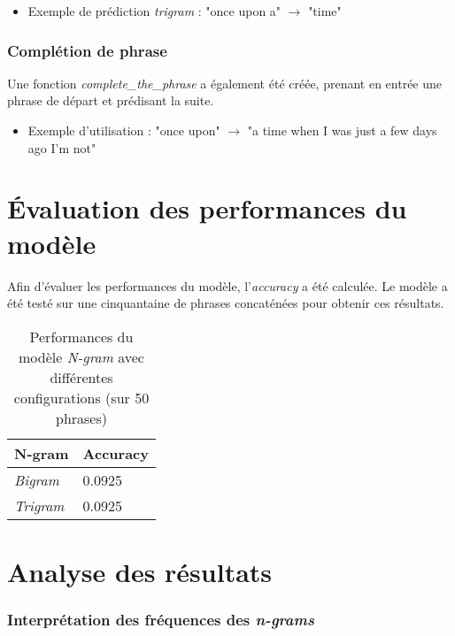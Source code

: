 \begin{itemize}
    \item Exemple de prédiction \textit{trigram} : "once upon a" $\rightarrow$ "time"
\end{itemize}

\subsubsection*{Complétion de phrase}

Une fonction \textit{complete\_the\_phrase} a également été créée, prenant en entrée une phrase de départ et prédisant la suite.

\begin{itemize}
    \item Exemple d'utilisation : "once upon" $\rightarrow$ "a time when I was just a few days ago I’m not"
\end{itemize}

\section{Évaluation des performances du modèle}

Afin d'évaluer les performances du modèle, l'\textit{accuracy} a été calculée. Le modèle a été testé sur une cinquantaine de phrases concaténées pour obtenir ces résultats.
\begin{table}[h]
    \centering
    \begin{tabular}{|l|l|}
    \hline
    \textbf{N-gram} & \textbf{Accuracy} \\ \hline
    \textit{Bigram} & 0.0925   \\ \hline
    \textit{Trigram} & 0.0925  \\ \hline
    \end{tabular}
    \caption{Performances du modèle \textit{N-gram} avec différentes configurations (sur 50 phrases)}
\end{table}

\section{Analyse des résultats}

\subsubsection{Interprétation des fréquences des \textit{n-grams}}

